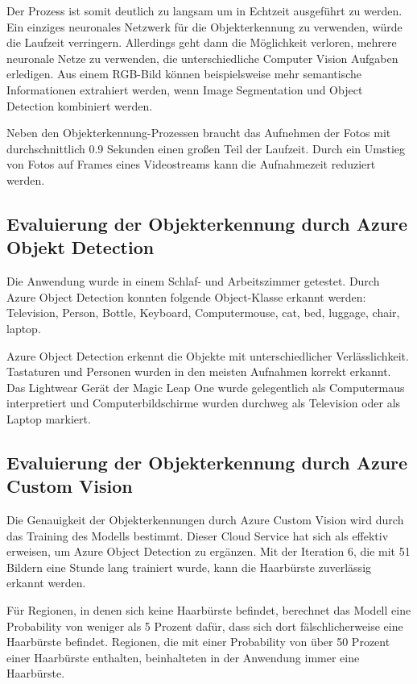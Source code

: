 Der Prozess ist somit deutlich zu langsam um in Echtzeit ausgeführt zu werden. Ein einziges neuronales Netzwerk für die Objekterkennung zu verwenden, würde die Laufzeit verringern. Allerdings geht dann die Möglichkeit verloren, mehrere neuronale Netze zu verwenden, die unterschiedliche Computer Vision Aufgaben erledigen. Aus einem RGB-Bild können beispielsweise mehr semantische Informationen extrahiert werden, wenn Image Segmentation und Object Detection kombiniert werden.

Neben den Objekterkennung-Prozessen braucht das Aufnehmen der Fotos mit durchschnittlich 0.9 Sekunden einen großen Teil der Laufzeit. Durch ein Umstieg von Fotos auf Frames eines Videostreams kann die Aufnahmezeit reduziert werden.  


\subsection{Evaluierung der Objekterkennung durch Azure Objekt Detection}

Die Anwendung wurde in einem Schlaf- und Arbeitszimmer getestet. Durch Azure Object Detection konnten folgende Object-Klasse erkannt werden: Television, Person, Bottle, Keyboard, Computermouse, cat, bed, luggage, chair, laptop.

Azure Object Detection erkennt die Objekte mit unterschiedlicher Verlässlichkeit. Tastaturen und Personen wurden in den meisten Aufnahmen korrekt erkannt. Das Lightwear Gerät der Magic Leap One wurde gelegentlich als Computermaus interpretiert und Computerbildschirme wurden durchweg als Television oder als Laptop markiert.

\subsection{Evaluierung der Objekterkennung durch Azure Custom Vision}

Die Genauigkeit der Objekterkennungen durch Azure Custom Vision wird durch das Training des Modells bestimmt. Dieser Cloud Service hat sich als effektiv erweisen, um Azure Object Detection zu ergänzen. Mit der Iteration 6, die mit 51 Bildern eine Stunde lang trainiert wurde, kann die Haarbürste zuverlässig erkannt werden. 

Für Regionen, in denen sich keine Haarbürste befindet, berechnet das Modell eine Probability von weniger als 5 Prozent dafür, dass sich dort fälschlicherweise eine Haarbürste befindet. Regionen, die mit einer Probability von über 50 Prozent einer Haarbürste enthalten, beinhalteten in der Anwendung immer eine Haarbürste.


